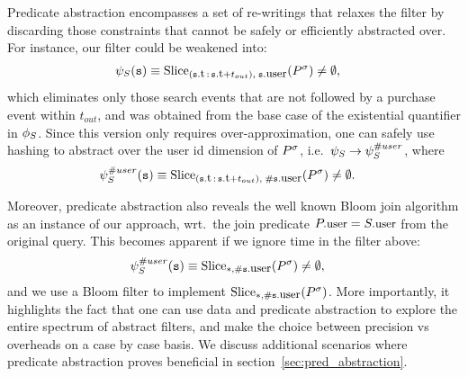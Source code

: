 Predicate abstraction encompasses a set of re-writings 
that relaxes the filter by discarding those constraints that cannot be safely
or efficiently abstracted over.
For instance, our filter could be weakened into:
\begin{align*}
&
\PrecedesPPP(\symv{s}) \equiv 
\slice{\syms{P}}
{(\facc{\symv{s}}{t}\,:\,\facc{\symv{s}}{t} + t_{out}),\; 
	\facc{\symv{s}}{user}}
\neq \emptyset,
\end{align*} 
which eliminates only those search events that are not followed by a purchase
event within $t_{out}$, and was obtained from the base case of
the existential quantifier in $\phi_{S}$.
Since this version only requires over-approximation, one can safely use hashing
to abstract over the user id dimension of ${P}^{\sigma}$, i.e.\ 
$\psi_S \rightarrow \psi_S^{\# user}$, where
\begin{align*}
&
\PrecedesPPP^{\hashid{user}}(\symv{s}) \equiv 
\slice{\syms{P}}
{(\facc{\symv{s}}{t}\,:\,\facc{\symv{s}}{t} + t_{out}),\; 
	\hashid{\facc{\symv{s}}{user}}}
\neq \emptyset .
\end{align*}

Moreover, predicate abstraction also reveals the well known Bloom
join algorithm as an instance of our approach, wrt.\ the join
predicate $\facc{P}{user} = \facc{S}{user}$ from the original query. 
This becomes apparent if we ignore time in the filter above:
\begin{align*}
&
\PrecedesPPP^{\hashid{user}}(\symv{s}) \equiv 
\slice{\syms{P}}{*, \hashid{\facc{\symv{s}}{user}}}
\neq \emptyset,
\end{align*}
and we use a Bloom filter to implement 
$\slice{\syms{P}}{*, \hashid{\facc{\symv{s}}{user}}}$.
More importantly, it highlights the fact that one can use data and predicate 
abstraction to explore the entire spectrum of abstract filters, and make the 
choice between precision vs overheads on a case by case basis.
We discuss additional scenarios where predicate abstraction proves
beneficial in section~\ref{sec:pred_abstraction}.




